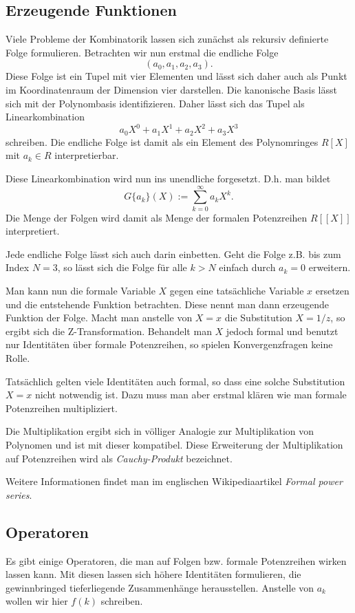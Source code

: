 \documentclass[a4paper,12pt,fleqn]{article}
\begin{document}
\subsection{Erzeugende Funktionen}
Viele Probleme der Kombinatorik lassen sich zunächst als
rekursiv definierte Folge formulieren. Betrachten wir nun erstmal
die endliche Folge
\[(a_0,a_1,a_2,a_3).\]
Diese Folge ist ein Tupel mit vier Elementen und lässt sich
daher auch als Punkt im Koordinatenraum der Dimension vier darstellen.
Die kanonische Basis lässt sich mit der Polynombasis identifizieren.
Daher lässt sich das Tupel als Linearkombination
\[a_0X^0+a_1X^1+a_2X^2+a_3X^3\]
schreiben. Die endliche Folge ist damit als ein Element
des Polynomringes $R[X]$ mit $a_k\in R$ interpretierbar.

Diese Linearkombination wird nun ins unendliche forgesetzt.
D.h. man bildet
\[G\{a_k\}(X) := \sum_{k=0}^\infty a_kX^k.\]
Die Menge der Folgen wird damit als Menge der formalen
Potenzreihen $R[[X]]$ interpretiert.

Jede endliche Folge lässt sich auch darin einbetten.
Geht die Folge z.B. bis zum Index $N=3$, so lässt sich die Folge
für alle $k>N$ einfach durch $a_k=0$ erweitern.

Man kann nun die formale Variable $X$ gegen eine tatsächliche
Variable $x$ ersetzen und die entstehende Funktion betrachten.
Diese nennt man dann erzeugende Funktion der Folge. Macht man anstelle
von $X=x$ die Substitution $X=1/z$, so ergibt sich die
Z-Transformation. Behandelt man $X$ jedoch formal und
benutzt nur Identitäten über formale Potenzreihen, so spielen
Konvergenzfragen keine Rolle.

Tatsächlich gelten viele Identitäten auch formal, so dass eine
solche Substitution $X=x$ nicht notwendig ist. Dazu muss man aber
erstmal klären wie man formale Potenzreihen multipliziert.

Die Multiplikation ergibt sich in völliger Analogie zur
Multiplikation von Polynomen und ist mit dieser kompatibel.
Diese Erweiterung der Multiplikation auf Potenzreihen wird
als \textit{Cauchy-Produkt} bezeichnet.

Weitere Informationen findet man im englischen Wikipediaartikel
\textit{Formal power series}.


\subsection{Operatoren}
Es gibt einige Operatoren, die man auf Folgen bzw. formale
Potenzreihen wirken lassen kann. Mit diesen lassen sich höhere
Identitäten formulieren, die gewinnbringed tieferliegende
Zusammenhänge herausstellen. Anstelle von $a_k$ wollen wir
hier $f(k)$ schreiben.
\end{document}
